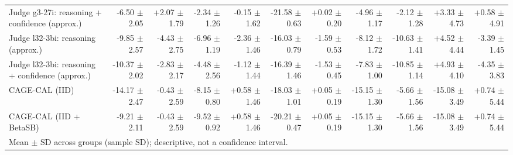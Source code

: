 \begin{tabular}{lrrrrrrrrrr}
Judge g3-27i: reasoning + confidence (approx.) & -6.50 {\scriptsize $\pm$ 2.05} & +2.07 {\scriptsize $\pm$ 1.79} & -2.34 {\scriptsize $\pm$ 1.26} & -0.15 {\scriptsize $\pm$ 1.62} & -21.58 {\scriptsize $\pm$ 0.63} & +0.02 {\scriptsize $\pm$ 0.20} & -4.96 {\scriptsize $\pm$ 1.17} & -2.12 {\scriptsize $\pm$ 1.28} & +3.33 {\scriptsize $\pm$ 4.73} & +0.58 {\scriptsize $\pm$ 4.91} \\
Judge l32-3bi: reasoning (approx.) & -9.85 {\scriptsize $\pm$ 2.57} & -4.43 {\scriptsize $\pm$ 2.75} & -6.96 {\scriptsize $\pm$ 1.19} & -2.36 {\scriptsize $\pm$ 1.46} & -16.03 {\scriptsize $\pm$ 0.79} & -1.59 {\scriptsize $\pm$ 0.53} & -8.12 {\scriptsize $\pm$ 1.72} & -10.63 {\scriptsize $\pm$ 1.41} & +4.52 {\scriptsize $\pm$ 4.44} & -3.39 {\scriptsize $\pm$ 1.45} \\
Judge l32-3bi: reasoning + confidence (approx.) & -10.37 {\scriptsize $\pm$ 2.02} & -2.83 {\scriptsize $\pm$ 2.17} & -4.48 {\scriptsize $\pm$ 2.56} & -1.12 {\scriptsize $\pm$ 1.44} & -16.39 {\scriptsize $\pm$ 1.46} & -1.53 {\scriptsize $\pm$ 0.45} & -7.83 {\scriptsize $\pm$ 1.00} & -10.85 {\scriptsize $\pm$ 1.14} & +4.93 {\scriptsize $\pm$ 4.10} & -4.35 {\scriptsize $\pm$ 3.83} \\
CAGE-CAL (IID) & -14.17 {\scriptsize $\pm$ 2.47} & -0.43 {\scriptsize $\pm$ 2.59} & -8.15 {\scriptsize $\pm$ 0.80} & +0.58 {\scriptsize $\pm$ 1.46} & -18.03 {\scriptsize $\pm$ 1.01} & +0.05 {\scriptsize $\pm$ 0.19} & -15.15 {\scriptsize $\pm$ 1.30} & -5.66 {\scriptsize $\pm$ 1.56} & -15.08 {\scriptsize $\pm$ 3.49} & +0.74 {\scriptsize $\pm$ 5.44} \\
CAGE-CAL (IID + BetaSB) & -9.21 {\scriptsize $\pm$ 2.11} & -0.43 {\scriptsize $\pm$ 2.59} & -9.52 {\scriptsize $\pm$ 0.92} & +0.58 {\scriptsize $\pm$ 1.46} & -20.21 {\scriptsize $\pm$ 0.47} & +0.05 {\scriptsize $\pm$ 0.19} & -15.15 {\scriptsize $\pm$ 1.30} & -5.66 {\scriptsize $\pm$ 1.56} & -15.08 {\scriptsize $\pm$ 3.49} & +0.74 {\scriptsize $\pm$ 5.44} \\
\bottomrule
\multicolumn{11}{l}{\scriptsize Mean $\pm$ SD across groups (sample SD); descriptive, not a confidence interval.} \\
\end{tabular}
